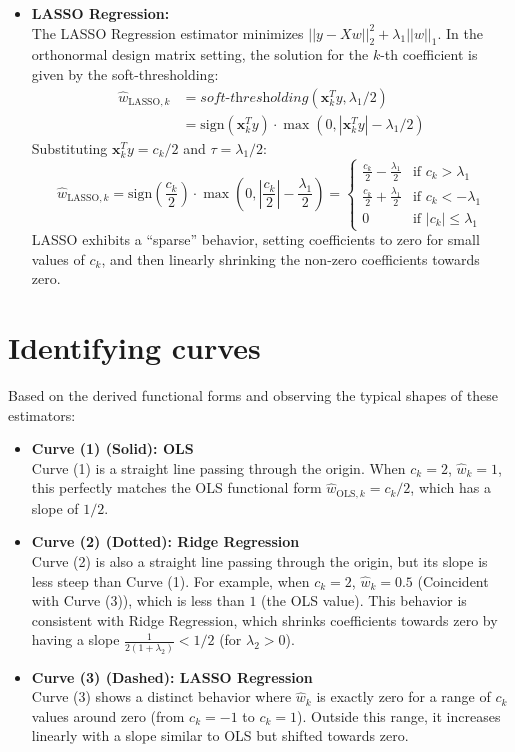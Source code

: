 \documentclass[11pt, a4paper, oneside]{memoir}
\begin{document}
\begin{itemize}
    \item \textbf{LASSO Regression:} \\
      The LASSO Regression estimator minimizes $||y - Xw||_2^2 + \lambda_1 ||w||_1$. In the orthonormal design matrix setting,
      the solution for the $k$-th coefficient is given by the soft-thresholding:
      \begin{align*}
        \hat{w}_{\text{LASSO},k} &= \textit{soft-thresholding}(\mathbf{x}_k^T y, \lambda_1/2) \\
        &= \text{sign}(\mathbf{x}_k^T y) \cdot \max(0, |\mathbf{x}_k^T y| - \lambda_1/2)
      \end{align*}
      Substituting $\mathbf{x}_k^T y = c_k / 2$ and $\tau = \lambda_1 / 2$:
      \[
      \hat{w}_{\text{LASSO},k} = \text{sign}\left(\frac{c_k}{2}\right) \cdot \max\left(0, \left|\frac{c_k}{2}\right| - \frac{\lambda_1}{2}\right)
      = \begin{cases}
        \frac{c_k}{2} - \frac{\lambda_1}{2} & \text{if } c_k > \lambda_1 \\
        \frac{c_k}{2} + \frac{\lambda_1}{2} & \text{if } c_k < -\lambda_1 \\
        0 & \text{if } |c_k| \le \lambda_1
      \end{cases}
      \]
      LASSO exhibits a ``sparse'' behavior, setting coefficients to zero for small values of $c_k$,
      and then linearly shrinking the non-zero coefficients towards zero.
\end{itemize}

\section{Identifying curves}
Based on the derived functional forms and observing the typical shapes of these estimators:
\begin{itemize}
    \item \textbf{Curve (1) (Solid): OLS} \\
      Curve (1) is a straight line passing through the origin. When $c_k=2$, $\hat{w}_k=1$,
      this perfectly matches the OLS functional form $\hat{w}_{\text{OLS},k} = c_k / 2$, which has a slope of $1/2$.
    \item \textbf{Curve (2) (Dotted): Ridge Regression} \\
      Curve (2) is also a straight line passing through the origin, but its slope is less steep than Curve (1).
      For example, when $c_k=2$, $\hat{w}_k = 0.5$ (Coincident with Curve (3)), which is less than $1$ (the OLS value). This behavior is consistent with Ridge Regression,
      which shrinks coefficients towards zero by having a slope $\frac{1}{2(1 + \lambda_2)} < 1/2$ (for $\lambda_2 > 0$).
    \item \textbf{Curve (3) (Dashed): LASSO Regression} \\
      Curve (3) shows a distinct behavior where $\hat{w}_k$ is exactly zero for a range of $c_k$ values around zero (from $c_k = -1$ to $c_k = 1$).
      Outside this range, it increases linearly with a slope similar to OLS but shifted towards zero.
\end{itemize}
\end{document}
